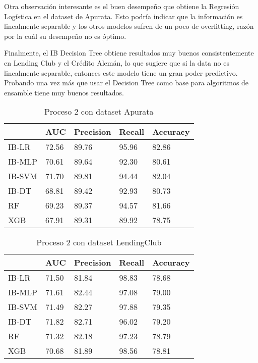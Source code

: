 Otra observación interesante es el buen desempeño que obtiene la Regresión Logística en el dataset de Apurata. Esto podría indicar que la información es linealmente separable y los otros modelos sufren de un poco de overfitting, razón por la cuál su desempeño no es óptimo.

Finalmente, el IB Decision Tree obtiene resultados muy buenos consistentemente en Lending Club y el Crédito Alemán, lo que sugiere que si la data no es linealmente separable, entonces este modelo tiene un gran poder predictivo. Probando una vez más que usar el Decision Tree como base para algoritmos de ensamble tiene muy buenos resultados.

\begin{table}[]
\centering
\caption{Proceso 2 con dataset Apurata}
\label{tab:apurata-proc2}
\begin{tabularx}{0.75\textwidth}{|l|Y Y Y Y|}
                \hline
                & AUC       & Precision & Recall    & Accuracy  \\
                \hline
IB-LR    		& 72.56     & 89.76     & 95.96     & 82.86		\\
IB-MLP   		& 70.61     & 89.64     & 92.30     & 80.61		\\
IB-SVM   		& 71.70     & 89.81     & 94.44     & 82.04		\\
IB-DT    		& 68.81     & 89.42     & 92.93     & 80.73		\\
				\hline
RF       		& 69.23     & 89.37     & 94.57     & 81.66		\\
XGB      		& 67.91     & 89.31     & 89.92     & 78.75		\\
                \hline
\end{tabularx}
\end{table}


\begin{table}[]
\centering
\caption{Proceso 2 con dataset LendingClub}
\label{tab:lc-proc2}
\begin{tabularx}{0.75\textwidth}{|l|Y Y Y Y|}
                \hline
                & AUC       & Precision & Recall    & Accuracy  \\
                \hline
IB-LR           & 71.50     & 81.84     & 98.83     & 78.68     \\
IB-MLP          & 71.61     & 82.44     & 97.08     & 79.00     \\
IB-SVM          & 71.49     & 82.27     & 97.88     & 79.35     \\
IB-DT           & 71.82     & 82.71     & 96.02     & 79.20     \\
                \hline
RF              & 71.32     & 82.18     & 97.23     & 78.79     \\
XGB             & 70.68     & 81.89     & 98.56     & 78.81     \\
                \hline
\end{tabularx}
\end{table}


